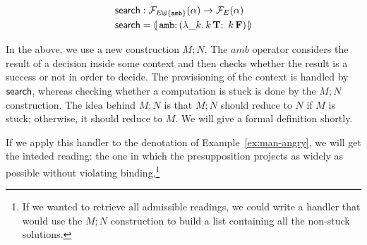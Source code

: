 \begin{align*}
  \search &: \FF_{E \uplus \{\op{amb}\}}(\alpha) \to \FF_E(\alpha) \\
  \search &= \banana{\onto{\op{amb}}{(\lam{\_ k}{\ap{k}{\true};\ \ap{k}{\false}})}}
\end{align*}

In the above, we use a new construction $M; N$. The $amb$ operator
considers the result of a decision inside some context and then checks
whether the result is a success or not in order to decide. The provisioning
of the context is handled by $\textsf{search}$, whereas checking whether a
computation is stuck is done by the $M; N$ construction. The idea behind
$M; N$ is that $M; N$ should reduce to $N$ if $M$ is stuck; otherwise, it
should reduce to $M$. We will give a formal definition shortly.

If we apply this handler to the denotation of Example~\ref{ex:man-angry},
we will get the inteded reading: the one in which the presupposition
projects as widely as possible without violating binding.\footnote{If we
  wanted to retrieve all admissible readings, we could write a handler that
  would use the $M; N$ construction to build a list containing all the
  non-stuck solutions.}

